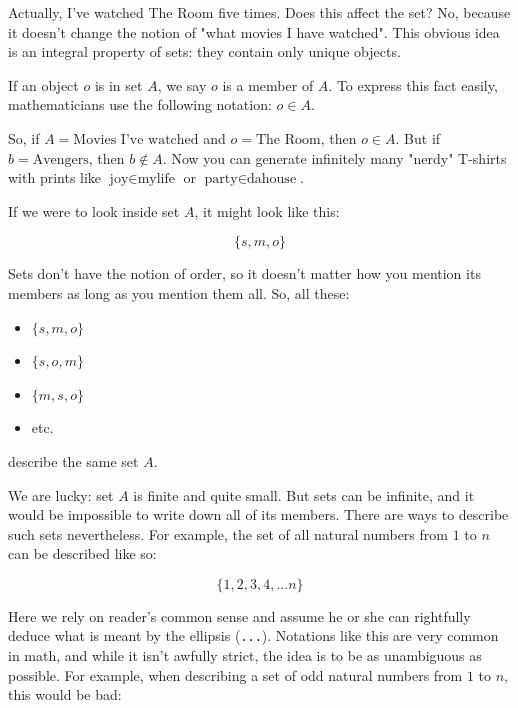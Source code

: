 \documentclass[12pt, a4paper, justified, notitlepage, sfsidenotes, notoc]{book}
\begin{document}
Actually, I've watched The Room five times. Does this affect the set? No, because it doesn't change the notion of "what movies I have watched". This obvious idea is an integral property of sets: they contain only unique objects.



If an object \(o\) is in set \(A\), we say \(o\) is a member of \(A\). To express this fact easily, mathematicians use the following notation: \(o \in A\).

So, if \(A = \textrm{Movies I've watched}\) and \(o = \textrm{The Room}\), then \(o \in A\). But if \(b = \textrm{Avengers}\),  then \(b \notin A\). Now you can generate infinitely many "nerdy" T-shirts with prints like \(\textrm{joy} \in \textrm{mylife}\) or \(\textrm{party} \in \textrm{dahouse}\).

If we were to look inside set \(A\), it might look like this:

\begin{equation}
\{s, m, o\}
\end{equation}

Sets don't have the notion of order, so it doesn't matter how you mention its members as long as you mention them all. So, all these:

\begin{itemize}
\item \(\{s, m, o\}\)
\item \(\{s, o, m\}\)
\item \(\{m, s, o\}\)
\item etc.
\end{itemize}

describe the same set \(A\).

We are lucky: set \(A\) is finite and quite small. But sets can be infinite, and it would be impossible to write down all of its members. There are ways to describe such sets nevertheless. For example, the set of all natural numbers from \(1\) to \(n\) can be described like so:

\begin{equation}
\{1, 2, 3, 4, ... n\}
\end{equation}

Here we rely on reader's common sense and assume he or she can rightfully deduce what is meant by the ellipsis (\texttt{...}). Notations like this are very common in math, and while it isn't awfully strict, the idea is to be as unambiguous as possible. For example, when describing a set of odd natural numbers from \(1\) to \(n\), this would be bad:
\end{document}
